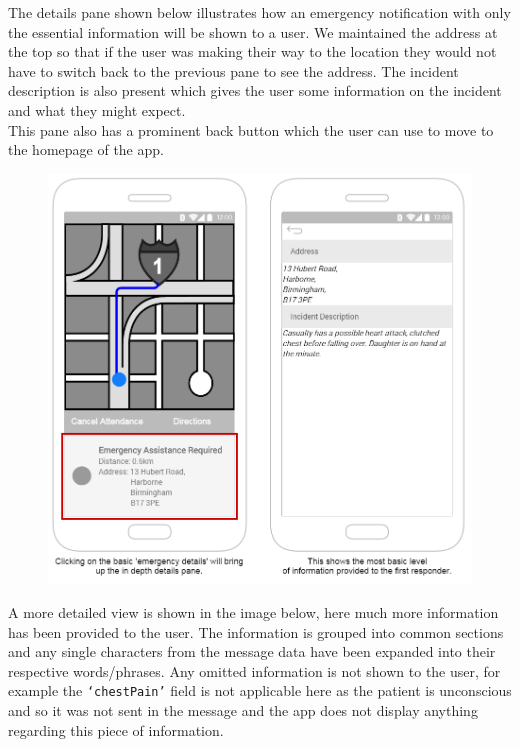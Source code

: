 \documentclass{article}
\begin{document}
The details pane shown below illustrates how an emergency notification with only the essential information will be shown to a user. We maintained the address at the top so that if the user was making their way to the location they would not have to switch back to the previous pane to see the address. The incident description is also present which gives the user some information on the incident and what they might expect.\\

This pane also has a prominent back button which the user can use to move to the homepage of the app.\\
	\begin{figure}[H]
		\centering
		\vspace{-20pt}
		\includegraphics[width=1\textwidth]{"Iteration4/Additional Details - 1"}
	\end{figure}
	
A more detailed view is shown in the image below, here much more information has been provided to the user. The information is grouped into common sections and any single characters from the message data have been expanded into their respective words/phrases. Any omitted information is not shown to the user, for example the \texttt{\color{OliveGreen}‘chestPain’} field is not applicable here as the patient is unconscious and so it was not sent in the message and the app does not display anything regarding this piece of information.\\
\end{document}
